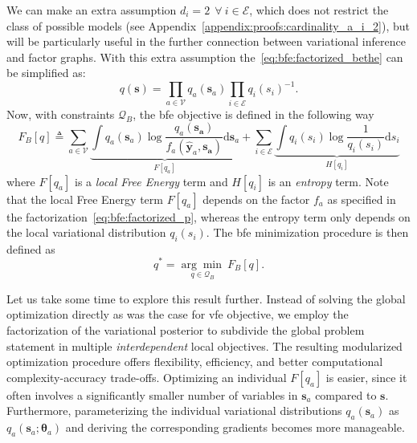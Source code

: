 We can make an extra assumption $d_i = 2~~\forall~i\in\mathcal{E}$, which does not restrict
the class of possible models (see Appendix~\ref{appendix:proofs:cardinality_a_i_2}), but will be particularly useful in the further connection between variational inference and factor graphs.
With this extra assumption the~\eqref{eq:bfe:factorized_bethe} can be simplified as: 
\begin{equation}
  \label{eq:bfe:factorized_bethe_simplified} q(\bm{s}) = \prod_{a\in\mathcal{V}} q_a(\bm{s}_a) \prod_{i\in\mathcal{E}}
  {q_i(s_i)}^{-1}.
\end{equation} 
Now, with constraints $\mathcal{Q}_B$, the \ac{bfe} objective is defined in the following way
\begin{equation}
    \label{eq:bfe:bfe} F_{B}\left[q\right] \triangleq \sum_{a\in\mathcal{V}}\underbrace{\int
      q_a(\bm{s}_a)\log\frac{q_a(\bm{s_a})}{f_a(\hat{\bm{y}}_a, \bm{s_a})}\mathrm{d}\bm{s}_a}_{F\left[q_a\right]} + \sum_{i\in\mathcal{E}}
    \underbrace{\int q_i(s_i)\log\frac{1}{q_i(s_i)}\mathrm{d}s_i}_{H\left[q_i\right]}
  \end{equation} 
where $F[q_a]$ is a \textit{local Free Energy} term and $H\left[q_i\right]$ is an \textit{entropy} term.
Note that the local Free Energy term $F[q_a]$ depends on the factor $f_a$ as specified in the factorization~\eqref{eq:bfe:factorized_p}, whereas the entropy term only depends on the local variational distribution $q_i(s_i)$.
The \ac{bfe} minimization procedure is then defined as
\begin{equation}
    \label{eq:bfe:bfe_minimization}
    q^* = \underset{q \in \mathcal{Q}_B}{\arg\min~}F_B[q].
\end{equation}


Let us take some time to explore this result further.
Instead of solving the global optimization directly as was the case for \ac{vfe} objective, we employ
the factorization of the variational posterior to subdivide the global problem statement in multiple \emph{interdependent} local objectives.
The resulting modularized optimization procedure offers flexibility, efficiency, and better
computational complexity-accuracy trade-offs.
Optimizing an individual $F\left[q_a\right]$ is easier, since it often involves a
significantly smaller number of variables in $\bm{s}_a$ compared to $\bm{s}$.
Furthermore, parameterizing the individual variational distributions $q_a(\bm{s}_a)$ as $q_a(\bm{s}_a; \bm{\theta}_a)$ 
and deriving the corresponding gradients becomes more manageable.

